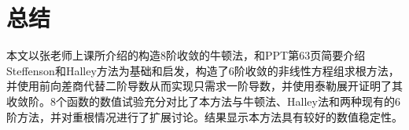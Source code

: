 
\section{总结}

本文以张老师上课所介绍的构造8阶收敛的牛顿法，和PPT第63页简要介绍Steffenson和Halley方法为基础和启发，构造了6阶收敛的非线性方程组求根方法，并使用前向差商代替二阶导数从而实现只需求一阶导数，并使用泰勒展开证明了其收敛阶。8个函数的数值试验充分对比了本方法与牛顿法、Halley法和两种现有的6阶方法，并对重根情况进行了扩展讨论。结果显示本方法具有较好的数值稳定性。

